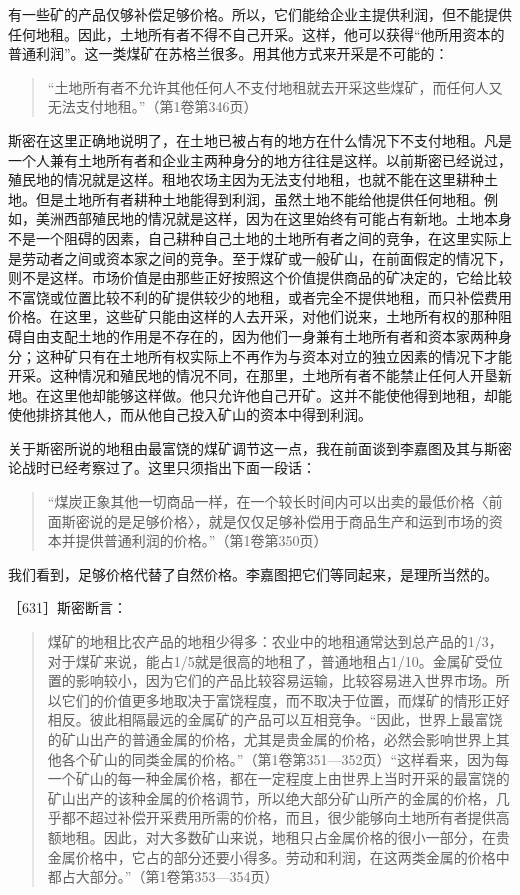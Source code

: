 有一些矿的产品仅够补偿足够价格。所以，它们能给企业主提供利润，但不能提供任何地租。因此，土地所有者不得不自己开采。这样，他可以获得“他所用资本的普通利润”。这一类煤矿在苏格兰很多。用其他方式来开采是不可能的：

\begin{quote}{“土地所有者不允许其他任何人不支付地租就去开采这些煤矿，而任何人又无法支付地租。”（第1卷第346页）}\end{quote}

斯密在这里正确地说明了，在土地已被占有的地方在什么情况下不支付地租。凡是一个人兼有土地所有者和企业主两种身分的地方往往是这样。以前斯密已经说过，殖民地的情况就是这样。租地农场主因为无法支付地租，也就不能在这里耕种土地。但是土地所有者耕种土地能得到利润，虽然土地不能给他提供任何地租。例如，美洲西部殖民地的情况就是这样，因为在这里始终有可能占有新地。土地本身不是一个阻碍的因素，自己耕种自己土地的土地所有者之间的竞争，在这里实际上是劳动者之间或资本家之间的竞争。至于煤矿或一般矿山，在前面假定的情况下，则不是这样。市场价值是由那些正好按照这个价值提供商品的矿决定的，它给比较不富饶或位置比较不利的矿提供较少的地租，或者完全不提供地租，而只补偿费用价格。在这里，这些矿只能由这样的人去开采，对他们说来，土地所有权的那种阻碍自由支配土地的作用是不存在的，因为他们一身兼有土地所有者和资本家两种身分；这种矿只有在土地所有权实际上不再作为与资本对立的独立因素的情况下才能开采。这种情况和殖民地的情况不同，在那里，土地所有者不能禁止任何人开垦新地。在这里他却能够这样做。他只允许他自己开矿。这并不能使他得到地租，却能使他排挤其他人，而从他自己投入矿山的资本中得到利润。

关于斯密所说的地租由最富饶的煤矿调节这一点，我在前面谈到李嘉图及其与斯密论战时已经考察过了。这里只须指出下面一段话：

\begin{quote}{“煤炭正象其他一切商品一样，在一个较长时间内可以出卖的最低价格〈前面斯密说的是足够价格〉，就是仅仅足够补偿用于商品生产和运到市场的资本并提供普通利润的价格。”（第1卷第350页）}\end{quote}

我们看到，足够价格代替了自然价格。李嘉图把它们等同起来，是理所当然的。

［631］斯密断言：

\begin{quote}{煤矿的地租比农产品的地租少得多：农业中的地租通常达到总产品的1/3，对于煤矿来说，能占1/5就是很高的地租了，普通地租占1/10。金属矿受位置的影响较小，因为它们的产品比较容易运输，比较容易进入世界市场。所以它们的价值更多地取决于富饶程度，而不取决于位置，而煤矿的情形正好相反。彼此相隔最远的金属矿的产品可以互相竞争。“因此，世界上最富饶的矿山出产的普通金属的价格，尤其是贵金属的价格，必然会影响世界上其他各个矿山的同类金属的价格。”（第1卷第351—352页）“这样看来，因为每一个矿山的每一种金属价格，都在一定程度上由世界上当时开采的最富饶的矿山出产的该种金属的价格调节，所以绝大部分矿山所产的金属的价格，几乎都不超过补偿开采费用所需的价格，而且，很少能够向土地所有者提供高额地租。因此，对大多数矿山来说，地租只占金属价格的很小一部分，在贵金属价格中，它占的部分还要小得多。劳动和利润，在这两类金属的价格中都占大部分。”（第1卷第353—354页）}\end{quote}

